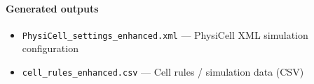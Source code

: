 \paragraph{Generated outputs}
\begin{itemize}
\item \texttt{PhysiCell\_\allowbreak{}settings\_\allowbreak{}enhanced.\allowbreak{}xml} — PhysiCell XML simulation configuration
\item \texttt{cell\_\allowbreak{}rules\_\allowbreak{}enhanced.\allowbreak{}csv} — Cell rules / simulation data (CSV)
\end{itemize}
